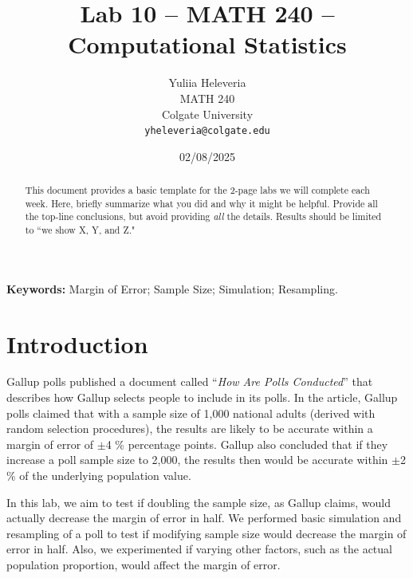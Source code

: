 \documentclass{article}\usepackage[]{graphicx}\usepackage[]{xcolor}
\begin{document}
\vspace{-1in}
\title{Lab 10 -- MATH 240 -- Computational Statistics}

\author{
  Yuliia Heleveria \\
  MATH 240  \\
  Colgate University  \\
  {\tt yheleveria@colgate.edu}
}

\date{02/08/2025}

\maketitle

\begin{multicols}{2}
\raggedcolumns %
\begin{abstract}
This document provides a basic template for the 2-page labs we will complete each week. Here, briefly summarize what you did and why it might be helpful. Provide all the top-line conclusions, but avoid providing \emph{all} the details. Results should be limited to ``we show X, Y, and Z."
\end{abstract}

\noindent \textbf{Keywords:} Margin of Error; Sample Size; Simulation; Resampling.

\section{Introduction}

Gallup polls published a document called ``\textit{How Are Polls Conducted}'' that describes how Gallup selects people to include in its polls. In the article, Gallup polls claimed that with a sample size of 1,000 national adults (derived with random selection procedures), the results are likely to be accurate within a margin of error of  $\pm$4 \% percentage points. Gallup also concluded that if they increase a poll sample size to 2,000, the results then would be accurate within $\pm$2 \% of the underlying population value. 

In this lab, we aim to test if doubling the sample size, as Gallup claims, would actually decrease the margin of error in half. We performed basic simulation and resampling of a poll to test if modifying sample size would decrease the margin of error in half. Also, we experimented if varying other factors, such as the actual population proportion, would affect the margin of error.


\end{multicols}
\end{document}
